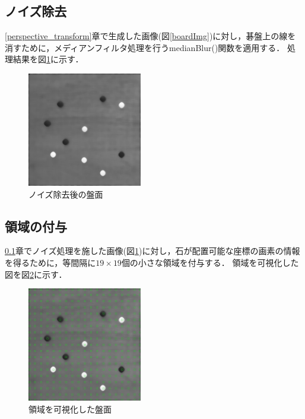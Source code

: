\documentclass[openright]{nitocs}
\numberwithin{equation}{section}
\begin{document}
        \subsection{ノイズ除去}
            \label{reduceNoise}
            \ref{perspective_transform}章で生成した画像(図\ref{boardImg})に対し，碁盤上の線を消すために，メディアンフィルタ処理を行うmedianBlur()関数を適用する．
            処理結果を図\ref{noiseReduced}に示す．
            \begin{figure} %
                \begin{center}
                \includegraphics[width=50mm,height=50mm]{noiseReducedImg.jpg} 
                \caption{ノイズ除去後の盤面}
                \label{noiseReduced}
                \end{center}
            \end{figure}

        \subsection{領域の付与}
            \label{area}
            \ref{reduceNoise}章でノイズ処理を施した画像(図\ref{noiseReduced})に対し，石が配置可能な座標の画素の情報を得るために，等間隔に$19\times19$個の小さな領域を付与する．
            領域を可視化した図を図\ref{boardWithArea}に示す．
            \begin{figure} %
                \begin{center}
                \includegraphics[width=50mm,height=50mm]{boardWithAreaImg.jpg} 
                \caption{領域を可視化した盤面}
                \label{boardWithArea}
                \end{center}
            \end{figure}
\end{document}
